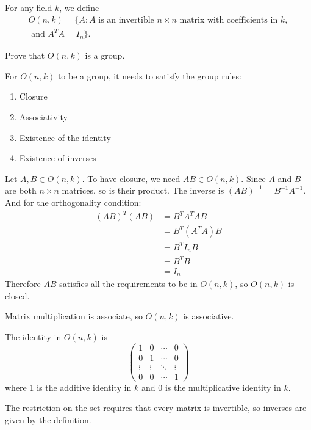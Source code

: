 \documentclass[a4paper]{article}
\begin{document}


\begin{questionbody}
For any field $k$, we define \begin{equation*}
\begin{split}
O(n, k) = \{ A : A \text{ is an invertible } n \times n \text{ matrix with coefficients in } k, \\
\text{ and } A^T A = I_n \}.
\end{split}
\end{equation*}

Prove that $O(n, k)$ is a group.
\end{questionbody}

For $O(n, k)$ to be a group, it needs to satisfy the group rules:
\begin{enumerate}[1.]
\item Closure
\item Associativity
\item Existence of the identity
\item Existence of inverses
\end{enumerate}

Let $A, B \in O(n, k)$. To have closure, we need $AB \in O(n, k)$. Since $A$ and $B$ are both $n \times n$ matrices, so is their product. The inverse is ${(AB)}^{-1} = B^{-1} A^{-1}$. And for the orthogonality condition:
\begin{align*}
{(AB)}^T (AB) &= B^T A^T A B \\
&= B^T (A^T A) B \\
&= B^T I_n B \\
&= B^T B \\
&= I_n
\end{align*}
Therefore $AB$ satisfies all the requirements to be in $O(n, k)$, so $O(n, k)$ is closed.

Matrix multiplication is associate, so $O(n, k)$ is associative.

The identity in $O(n, k)$ is \[ \begin{pmatrix}
    1 & 0 & \cdots & 0 \\
    0 & 1 & \cdots & 0 \\
    \vdots & \vdots & \ddots & \vdots \\
    0 & 0 & \cdots & 1
\end{pmatrix} \] where 1 is the additive identity in $k$ and 0 is the multiplicative identity in $k$.

The restriction on the set requires that every matrix is invertible, so inverses are given by the definition.
\end{document}
